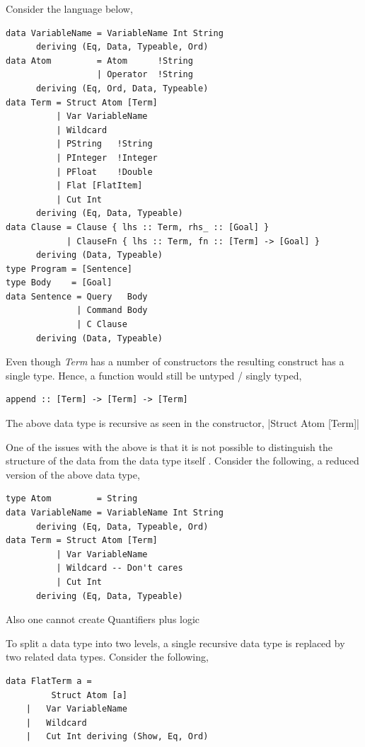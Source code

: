 \documentclass[thesis-solanki.tex]{subfiles}
\begin{document}
Consider the language below,

\begin{verbatim}	
data VariableName = VariableName Int String
      deriving (Eq, Data, Typeable, Ord)
data Atom         = Atom      !String
                  | Operator  !String
      deriving (Eq, Ord, Data, Typeable)
data Term = Struct Atom [Term]
          | Var VariableName
          | Wildcard
          | PString   !String
          | PInteger  !Integer
          | PFloat    !Double
          | Flat [FlatItem]
          | Cut Int
      deriving (Eq, Data, Typeable)
data Clause = Clause { lhs :: Term, rhs_ :: [Goal] }
            | ClauseFn { lhs :: Term, fn :: [Term] -> [Goal] }
      deriving (Data, Typeable)
type Program = [Sentence]
type Body    = [Goal]
data Sentence = Query   Body
              | Command Body
              | C Clause
      deriving (Data, Typeable)
\end{verbatim}

Even though \textit{Term} has a number of constructors the resulting construct has a single type. Hence, a function would still be untyped 
/ singly typed,
\begin{verbatim}
append :: [Term] -> [Term] -> [Term]
\end{verbatim} 

The above data type is recursive as seen in the constructor,
|Struct Atom [Term]|

One of the issues with the above is that it is not possible to distinguish the structure of the data from the data type itself 
\cite{sheard2004two}. Consider the following, a reduced version of the above data type,

\begin{verbatim}
type Atom         = String
data VariableName = VariableName Int String
      deriving (Eq, Data, Typeable, Ord)
data Term = Struct Atom [Term]
          | Var VariableName
          | Wildcard -- Don't cares 
          | Cut Int
      deriving (Eq, Data, Typeable)
\end{verbatim}

Also one cannot create Quantifiers plus logic 

To split a data type into two levels, a single recursive data type is replaced by two related data types. Consider the following,
\begin{verbatim}
data FlatTerm a = 
		 Struct Atom [a]
	|	Var VariableName
	|	Wildcard
	|	Cut Int deriving (Show, Eq, Ord)
\end{verbatim}
\end{document}
